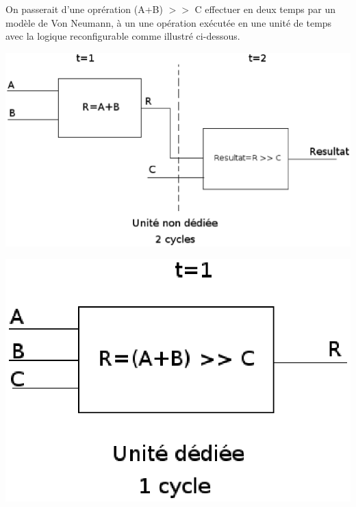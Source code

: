 On passerait d'une oprération (A+B) $>>$ C effectuer en deux temps par un modèle de
Von Neumann, à un une opération exécutée en une unité de temps avec la logique
reconfigurable comme illustré ci-dessous.


\begin{center} \includegraphics[scale=0.4]{bloc2.eps}

    \includegraphics[scale=0.4]{bloc1.eps}

\end{center}
